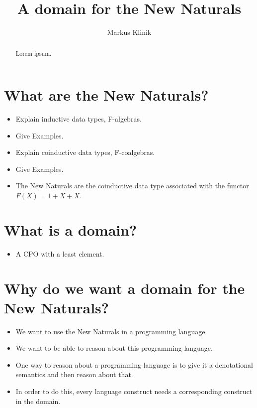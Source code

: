 \documentclass[a4paper]{article}
\begin{document}
\title{A domain for the New Naturals}
\author{Markus Klinik}
\maketitle

\begin{abstract}
Lorem ipsum.
\end{abstract}

\section{What are the New Naturals?}

\begin{itemize}
\item Explain inductive data types, F-algebras.
\item Give Examples.
\item Explain coinductive data types, F-coalgebras.
\item Give Examples.
\item The New Naturals are the coinductive data type associated with the
functor $F(X) = 1 + X + X$.
\end{itemize}

\section{What is a domain?}

\begin{itemize}
\item A CPO with a least element.
\end{itemize}

\section{Why do we want a domain for the New Naturals?}

\begin{itemize}
\item We want to use the New Naturals in a programming language.
\item We want to be able to reason about this programming language.
\item One way to reason about a programming language is to give it a
denotational semantics and then reason about that.
\item In order to do this, every language construct needs a corresponding
construct in the domain.
\end{itemize}
\end{document}
